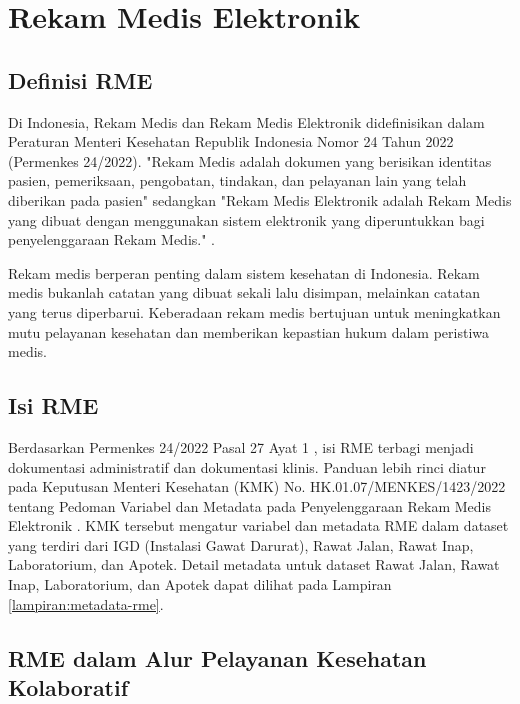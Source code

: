 \section{Rekam Medis Elektronik}

\subsection{Definisi RME}
\label{subsec:definisi-rme}

Di Indonesia, Rekam Medis dan Rekam Medis Elektronik didefinisikan dalam Peraturan Menteri Kesehatan Republik Indonesia Nomor 24 Tahun 2022 (Permenkes 24/2022). "Rekam Medis adalah dokumen yang berisikan identitas pasien, pemeriksaan, pengobatan, tindakan, dan pelayanan lain yang telah diberikan pada pasien" sedangkan "Rekam Medis Elektronik adalah Rekam Medis yang dibuat dengan menggunakan sistem elektronik yang diperuntukkan bagi penyelenggaraan Rekam Medis." \autocite{permenkes24_2022}.

Rekam medis berperan penting dalam sistem kesehatan di Indonesia. Rekam medis bukanlah catatan yang dibuat sekali lalu disimpan, melainkan catatan yang terus diperbarui. Keberadaan rekam medis bertujuan untuk meningkatkan mutu pelayanan kesehatan dan memberikan kepastian hukum dalam peristiwa medis.

\subsection{Isi RME}
\label{subsec:isi-rme}

Berdasarkan Permenkes 24/2022 Pasal 27 Ayat 1 \autocite{permenkes24_2022}, isi RME terbagi menjadi dokumentasi administratif dan dokumentasi klinis. Panduan lebih rinci diatur pada Keputusan Menteri Kesehatan (KMK) No. HK.01.07/MENKES/1423/2022 tentang Pedoman Variabel dan Metadata pada Penyelenggaraan Rekam Medis Elektronik \autocite{kemenkes1423-2022}. KMK tersebut mengatur variabel dan metadata RME dalam dataset yang terdiri dari IGD (Instalasi Gawat Darurat), Rawat Jalan, Rawat Inap, Laboratorium, dan Apotek. Detail metadata untuk dataset Rawat Jalan, Rawat Inap, Laboratorium, dan Apotek dapat dilihat pada Lampiran \ref{lampiran:metadata-rme}.

\subsection{RME dalam Alur Pelayanan Kesehatan Kolaboratif}
\label{subsec:rme-layanan-kolaboratif}

